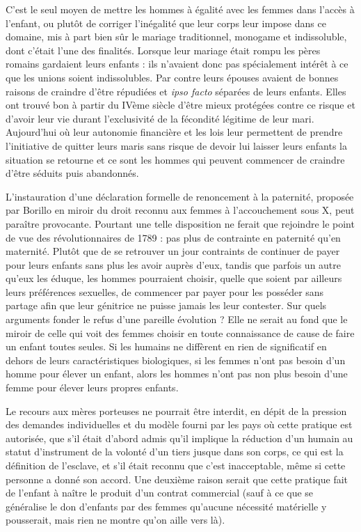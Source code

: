  C'est le seul moyen de mettre les hommes à égalité avec les femmes dans l'accès à l'enfant, ou plutôt de corriger l'inégalité que leur corps leur impose dans ce domaine, mis à part bien sûr le mariage traditionnel, monogame et indissoluble, dont c'était l'une des finalités. Lorsque leur mariage était rompu les pères romains gardaient leurs enfants : ils n'avaient donc pas spécialement intérêt à ce que les unions soient indissolubles. Par contre leurs épouses avaient de bonnes raisons de craindre d'être répudiées et \emph{ipso facto} séparées de leurs enfants. Elles ont trouvé bon à partir du IVème siècle d'être mieux protégées contre ce risque et d'avoir leur vie durant l'exclusivité de la fécondité légitime de leur mari. Aujourd'hui où leur autonomie financière et les lois leur permettent de prendre l'initiative de quitter leurs maris sans risque de devoir lui laisser leurs enfants la situation se retourne et ce sont les hommes qui peuvent commencer de craindre d'être séduits puis abandonnés. 
 
L’instauration d'une déclaration formelle de renoncement à la paternité, proposée par Borillo en miroir du droit reconnu aux femmes à l'accouchement sous X, peut paraître provocante. Pourtant une telle disposition ne ferait que rejoindre le point de vue des révolutionnaires de 1789 : pas plus de contrainte en paternité qu’en maternité. Plutôt que de se retrouver un jour contraints de continuer de payer pour leurs enfants sans plus les avoir auprès d'eux, tandis que parfois un autre qu'eux les éduque, les hommes pourraient choisir, quelle que soient par ailleurs leurs préférences sexuelles, de commencer par payer pour les posséder sans partage afin que leur génitrice ne puisse jamais les leur contester. Sur quels arguments fonder le refus d'une pareille évolution ? Elle ne serait au fond que le miroir de celle qui voit des femmes choisir en toute connaissance de cause de faire un enfant toutes seules. Si les humains ne diffèrent en rien de significatif en dehors de leurs caractéristiques biologiques, si les femmes n'ont pas besoin d'un homme pour élever un enfant, alors les hommes n'ont pas non plus besoin d'une femme pour élever leurs propres enfants.
 
 Le recours aux mères porteuses ne pourrait être interdit, en dépit de la pression des demandes individuelles et du modèle fourni par les pays où cette pratique est autorisée, que s'il était d'abord admis qu'il implique la réduction d'un humain au statut d'instrument de la volonté d'un tiers jusque dans son corps, ce qui est la définition de l'esclave, et s'il était reconnu que c'est inacceptable, même si cette personne a donné son accord. Une deuxième raison serait que cette pratique fait de l'enfant à naître le produit d'un contrat commercial (sauf à ce que se généralise le don d'enfants par des femmes qu'aucune nécessité matérielle y pousserait, mais rien ne montre qu'on aille vers là).
  
